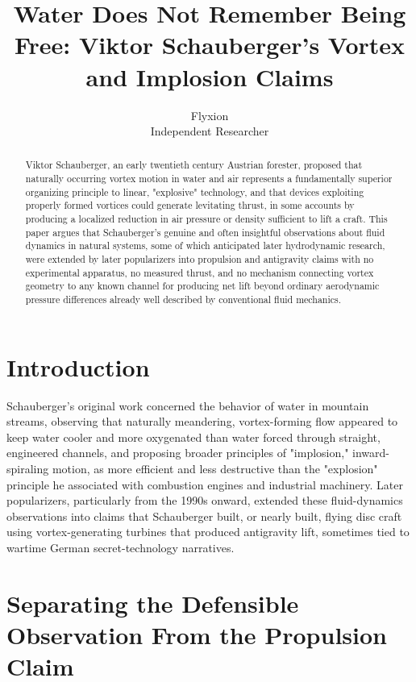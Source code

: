 \documentclass[11pt]{article}
\title{Water Does Not Remember Being Free: Viktor Schauberger's Vortex and Implosion Claims}
\author{Flyxion \\ \small Independent Researcher}
\date{}
\begin{document}
\maketitle

\begin{abstract}
Viktor Schauberger, an early twentieth century Austrian forester, proposed that naturally occurring vortex motion in water and air represents a fundamentally superior organizing principle to linear, "explosive" technology, and that devices exploiting properly formed vortices could generate levitating thrust, in some accounts by producing a localized reduction in air pressure or density sufficient to lift a craft. This paper argues that Schauberger's genuine and often insightful observations about fluid dynamics in natural systems, some of which anticipated later hydrodynamic research, were extended by later popularizers into propulsion and antigravity claims with no experimental apparatus, no measured thrust, and no mechanism connecting vortex geometry to any known channel for producing net lift beyond ordinary aerodynamic pressure differences already well described by conventional fluid mechanics.
\end{abstract}

\section{Introduction}

Schauberger's original work concerned the behavior of water in mountain streams, observing that naturally meandering, vortex-forming flow appeared to keep water cooler and more oxygenated than water forced through straight, engineered channels, and proposing broader principles of "implosion," inward-spiraling motion, as more efficient and less destructive than the "explosion" principle he associated with combustion engines and industrial machinery. Later popularizers, particularly from the 1990s onward, extended these fluid-dynamics observations into claims that Schauberger built, or nearly built, flying disc craft using vortex-generating turbines that produced antigravity lift, sometimes tied to wartime German secret-technology narratives.

\section{Separating the Defensible Observation From the Propulsion Claim}
\end{document}
